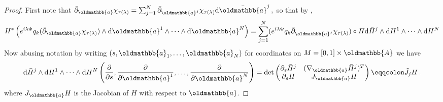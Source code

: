 \documentclass[
	fontsize=11pt, 
	twoside=false, 
	abstract=true, 
	a4paper,
]{scrartcl}
\newcommand{\dd}{\mathrm{d}}
\newcommand{\del}{\partial}
\newcommand{\td}[1]{\tilde{#1}}
\newcommand{\mf}[1]{\oldmathbb{#1}}
\begin{document}
\begin{proof}
	First note that $\bar\del_{\mf{a}}\chi_{\tau(\lambda)} = \sum_{j=1}^{N} \bar\del_{\mf{a}^j}\chi_{\tau(\lambda)} \dd \bar{\mf{a}}^j\,,$ so that by \cite[Lem.~14.16]{zbMATH06034615}, 
	\begin{equation*}
		H^\ast \left(e^{i\lambda\Phi} q_k(\bar\del_{\mf{a}}\chi_{\tau(\lambda)}) \wedge \dd \mf{a}^1\wedge\dots\wedge\dd\mf{a}^{N}\right) %
		=\sum_{j=1}^{N}(e^{i\lambda\Phi} q_k \bar\del_{\mf{a}^j}\chi_{\tau(\lambda)})\circ H \dd \bar{H}^j \wedge \dd H^1\wedge\dots\wedge\dd H^{N} 
	\end{equation*}
	Now abusing notation by writing $(s,\mf{a}_1,\dots,\mf{a}_{N})$ for coordinates on $M = [0,1]\times \mf{A}$ we have 
	\begin{align*}
		\dd \bar{H}^j \wedge \dd H^1\wedge\dots\wedge\dd H^{N}\left(\frac{\del}{\del s}, \frac{\del}{\del \mf{a}^1},\dots,\frac{\del}{\del \mf{a}^{N}}\right) = \det \begin{pmatrix}\del_s \bar H^j  & (\nabla_{\mf{a}} \bar H^j)^T \\ \del_s H & J_{\mf{a}} H \end{pmatrix} \eqqcolon \td{J}_{j} H\,.
	\end{align*}
	where $J_{\mf{a}}H$ is the Jacobian of $H$ with respect to $\mf{a}$. 


\end{proof}
\end{document}
